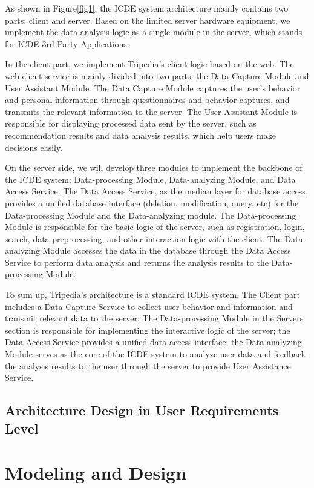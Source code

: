 \documentclass[conference]{IEEEtran}
\begin{document}
As shown in Figure\ref{fig1}, the ICDE system architecture mainly contains two parts: client and server. Based on the limited server hardware equipment, we implement the data analysis logic as a single module in the server, which stands for ICDE 3rd Party Applications. 

In the client part, we implement Tripedia's client logic based on the web. The web client service is mainly divided into two parts: the Data Capture Module and User Assistant Module. The Data Capture Module captures the user's behavior and personal information through questionnaires and behavior captures, and transmits the relevant information to the server. The User Assistant Module is responsible for displaying processed data sent by the server, such as recommendation results and data analysis results, which help users make decisions easily.

On the server side, we will develop three modules to implement the backbone of the ICDE system: Data-processing Module, Data-analyzing Module, and Data Access Service. The Data Access Service, as the median layer for database access, provides a unified database interface (deletion, modification, query, etc) for the Data-processing Module and the Data-analyzing module. The Data-processing Module is responsible for the basic logic of the server, such as registration, login, search, data preprocessing, and other interaction logic with the client. The Data-analyzing Module accesses the data in the database through the Data Access Service to perform data analysis and returns the analysis results to the Data-processing Module.

To sum up, Tripedia's architecture is a standard ICDE system. The Client part includes a Data Capture Service to collect user behavior and information and transmit relevant data to the server. The Data-processing Module in the Servers section is responsible for implementing the interactive logic of the server; the Data Access Service provides a unified data access interface; the Data-analyzing Module serves as the core of the ICDE system to analyze user data and feedback the analysis results to the user through the server to provide User Assistance Service.


\subsection{\textbf{Architecture Design in User Requirements Level}}



\section{\textbf{Modeling and Design}}
\end{document}
